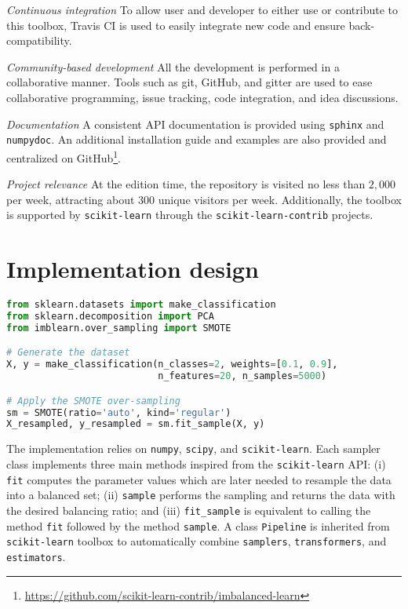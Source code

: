 \documentclass[twoside,11pt]{article}
\begin{document}
\noindent\textit{Continuous integration} To allow user and developer to either use or contribute to this toolbox, Travis CI is used to easily integrate new code and ensure back-compatibility.

\noindent\textit{Community-based development} All the development is performed in a collaborative manner.
Tools such as git, GitHub, and gitter are used to ease collaborative programming, issue tracking, code integration, and idea discussions.

\noindent\textit{Documentation} A consistent API documentation is provided using \texttt{sphinx} and \texttt{numpydoc}.
An additional installation guide and examples are also provided and centralized on GitHub\footnote{\url{https://github.com/scikit-learn-contrib/imbalanced-learn}}.

\noindent\textit{Project relevance} At the edition time, the repository is visited no less than $2,000$ per week, attracting about $300$ unique visitors per week.
Additionally, the toolbox is supported by \texttt{scikit-learn} through the \texttt{scikit-learn-contrib} projects.

\section{Implementation design}

\begin{lstlisting}[language=Python, caption=Code snippet to over-sample a dataset using SMOTE.]
from sklearn.datasets import make_classification
from sklearn.decomposition import PCA
from imblearn.over_sampling import SMOTE

# Generate the dataset
X, y = make_classification(n_classes=2, weights=[0.1, 0.9],
                           n_features=20, n_samples=5000)

# Apply the SMOTE over-sampling
sm = SMOTE(ratio='auto', kind='regular')
X_resampled, y_resampled = sm.fit_sample(X, y)
\end{lstlisting}

The implementation relies on \texttt{numpy}, \texttt{scipy}, and \texttt{scikit-learn}.
Each sampler class implements three main methods inspired from the \texttt{scikit-learn} API:
(i) \texttt{fit} computes the parameter values which are later needed to resample the data into a balanced set;
(ii) \texttt{sample} performs the sampling and returns the data with the desired balancing ratio;
and (iii) \texttt{fit\_sample} is equivalent to calling the method \texttt{fit} followed by the method \texttt{sample}.
A class \texttt{Pipeline} is inherited from \texttt{scikit-learn} toolbox to automatically combine \texttt{samplers}, \texttt{transformers}, and \texttt{estimators}.
\end{document}
